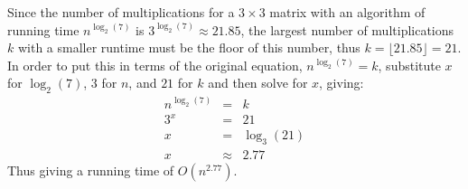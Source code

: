 Since the number of multiplications for a $3 \times 3$ matrix with an algorithm of running time $n^{\log_2(7)}$ is $3^{\log_2(7)} \approx 21.85$, the largest number of multiplications $k$ with a smaller runtime must be the floor of this number, thus $k = \lfloor 21.85 \rfloor = 21$. In order to put this in terms of the original equation, $n^{\log_2(7)} = k$, substitute $x$ for $\log_2(7)$, $3$ for $n$, and $21$ for $k$ and then solve for $x$, giving:
\begin{eqnarray*}
	n^{\log_2(7)} &=& k \\
	3^x &=& 21 \\
	x &=& \log_3(21) \\
	x &\approx& 2.77
\end{eqnarray*}
Thus giving a running time of $O(n^{2.77})$.
